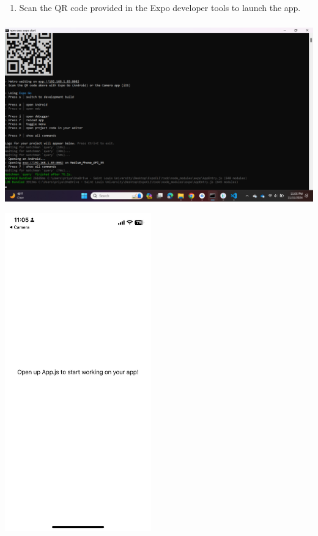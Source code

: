 \documentclass{article}
\begin{document}
\begin{enumerate}
    \item Scan the QR code provided in the Expo developer tools to launch the app.
\end{enumerate}
\includegraphics[width=5.57813in,height=3.13391in]{media/image25.png}
\includegraphics[width=2.49141in,height=5.53646in]{media/image3.jpg}
\end{document}
